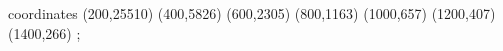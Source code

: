 \begin{axis}[
	xlabel={\Huge{minsup}},
	ylabel={\Huge{patterns}},
	xmin=200, xmax=1400,
\addplot+  [red]
	coordinates {
(200,25510)
(400,5826)
(600,2305)
(800,1163)
(1000,657)
(1200,407)
(1400,266)
	};   
\end{axis}